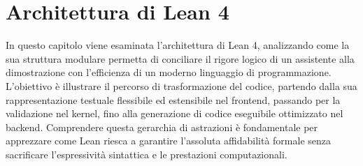 \chapter{Architettura di Lean 4}
\label{chap:architecture}

In questo capitolo viene esaminata l'architettura di Lean 4, analizzando come la sua struttura modulare permetta di conciliare il rigore logico di un assistente alla dimostrazione 
con l'efficienza di un moderno linguaggio di programmazione. L'obiettivo è illustrare il percorso di trasformazione del codice, partendo dalla sua rappresentazione testuale flessibile 
ed estensibile nel frontend, passando per la validazione nel kernel, fino alla generazione di codice eseguibile ottimizzato nel backend. Comprendere questa gerarchia di astrazioni è 
fondamentale per apprezzare come Lean riesca a garantire l'assoluta affidabilità formale senza sacrificare l'espressività sintattica e le prestazioni computazionali.

